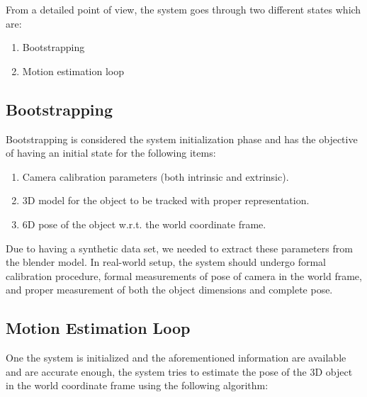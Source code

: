 \documentclass{article}
\begin{document}
From a detailed point of view, the system goes through two different states which are:
\begin{enumerate}
\item Bootstrapping
\item Motion estimation loop
\end{enumerate}

\subsection{Bootstrapping}
Bootstrapping is considered the system initialization phase and has the objective of having an initial state for the following items:
\begin{enumerate}
\item Camera calibration parameters (both intrinsic and extrinsic).
\item 3D model for the object to be tracked with proper representation.
\item 6D pose of the object w.r.t. the world coordinate frame.
\end{enumerate}
Due to having a synthetic data set, we needed to extract these parameters from the blender model. In real-world setup, the system should undergo formal calibration procedure, formal measurements of pose of camera in the world frame, and proper measurement of both the object dimensions and complete pose.

\subsection{Motion Estimation Loop}
One the system is initialized and the aforementioned information are available and are accurate enough, the system tries to estimate the pose of the 3D object in the world coordinate frame using the following algorithm:

\end{document}
